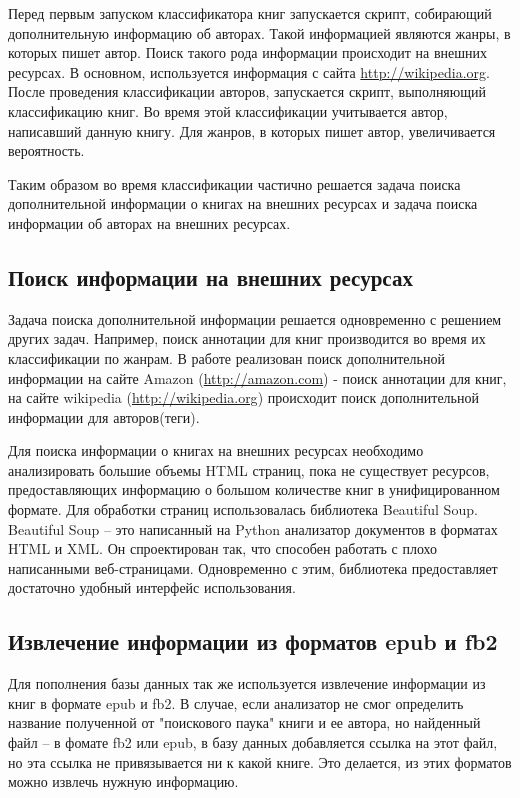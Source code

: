 \documentclass[a4paper, 12pt]{report}
\begin{document}
Перед первым запуском классификатора книг запускается скрипт, собирающий дополнительную информацию об авторах. Такой информацией являются жанры, в которых пишет автор. Поиск такого рода информации происходит на внешних ресурсах. В основном, используется информация с сайта \url{http://wikipedia.org}. После проведения классификации авторов, запускается скрипт, выполняющий классификацию книг. Во время этой классификации учитывается автор, написавший данную книгу. Для жанров, в которых пишет автор, увеличивается вероятность.

Таким образом во время классификации частично решается задача поиска дополнительной информации о книгах на внешних ресурсах и задача поиска информации об авторах на внешних ресурсах.


\subsection{Поиск информации на внешних ресурсах}

Задача поиска дополнительной информации решается одновременно с решением других задач. Например, поиск аннотации для книг производится во время их классификации по жанрам.
В работе реализован поиск дополнительной информации на сайте Amazon (\url {http://amazon.com}) - поиск аннотации для книг, на сайте wikipedia (\url {http://wikipedia.org}) происходит поиск дополнительной информации для авторов(теги).

Для поиска информации о книгах на внешних ресурсах необходимо анализировать большие объемы HTML страниц, \tk пока не существует ресурсов, предоставляющих информацию о большом количестве книг в унифицированном формате. Для обработки страниц использовалась библиотека Beautiful Soup. Beautiful Soup -- это написанный на Python анализатор документов в форматах HTML и XML. Он спроектирован так, что способен работать с плохо написанными  веб-страницами. Одновременно с этим, библиотека предоставляет достаточно удобный интерфейс использования.


\subsection{Извлечение информации из форматов epub и fb2}

Для пополнения базы данных так же используется извлечение информации из книг в формате epub и fb2. В случае, если анализатор не смог определить название полученной от "поискового паука" книги и ее автора, но найденный файл -- в фомате fb2 или epub, в базу данных добавляется ссылка на этот файл, но эта ссылка не привязывается ни к какой книге. Это делается, \tk из этих форматов можно извлечь нужную информацию. 
\end{document}
